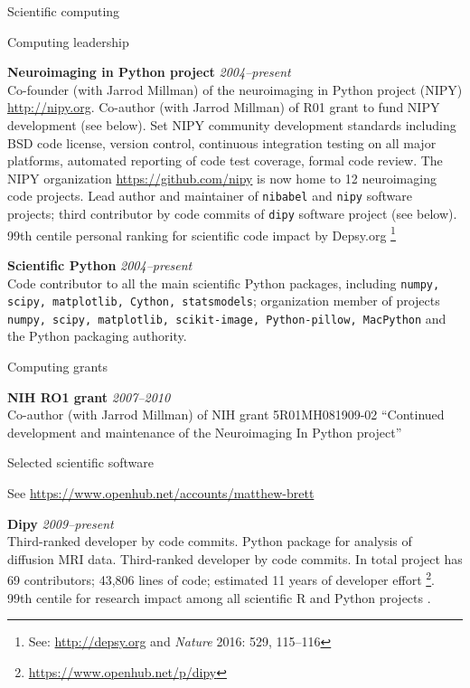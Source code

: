 \documentclass{cv}
\newcommand{\PlaceDateNote}[3]{{\bf #1} \hfill {\em #2} \\#3}
\newcommand{\Pkg}[1]{{\tt #1}}
\begin{document}
\begin{cvSection}{Scientific computing}

\begin{cvSubSection}{Computing leadership}

\PlaceDateNote{Neuroimaging in Python project}{2004--present}
{Co-founder (with Jarrod Millman) of the neuroimaging in Python project (NIPY)
    \url{http://nipy.org}.  Co-author (with Jarrod Millman) of R01 grant to
    fund NIPY development (see below).  Set
    NIPY community development standards including BSD code license, version
    control, continuous integration testing on all major platforms, automated
    reporting of code test coverage, formal code review.  The NIPY
    organization \url{https://github.com/nipy} is now home to 12 neuroimaging
code projects.  Lead author and maintainer of \Pkg{nibabel} and \Pkg{nipy}
software projects; third contributor by code commits of \Pkg{dipy} software
project (see below).  99th centile personal ranking for scientific code impact
by Depsy.org \footnote{See: \url{http://depsy.org} and {\em Nature} 2016: 529,
115–116\label{depsy}}}

\PlaceDateNote{Scientific Python}{2004--present}
{Code contributor to all the main scientific Python packages, including
    \Pkg{numpy, scipy, matplotlib, Cython, statsmodels}; organization member
    of projects \Pkg{numpy, scipy, matplotlib, scikit-image, Python-pillow,
MacPython} and the Python packaging authority.}

\end{cvSubSection}

\begin{cvSubSection}{Computing grants}

\PlaceDateNote{NIH RO1 grant}{2007--2010}
{Co-author (with Jarrod Millman) of NIH grant 5R01MH081909-02 ``Continued
development and maintenance of the Neuroimaging In Python project''}

\end{cvSubSection}

\begin{cvSubSection}{Selected scientific software}

See \url{https://www.openhub.net/accounts/matthew-brett}

\PlaceDateNote{Dipy}{2009--present}
{Third-ranked developer by code commits.  Python package for analysis of
    diffusion MRI data.  Third-ranked developer by code commits.  In total
    project has 69 contributors; 43,806 lines of code; estimated 11 years of
    developer effort
\footnote{\url{https://www.openhub.net/p/dipy}}. 99th centile for research
impact among all scientific R and Python projects \footref{depsy}.}


\end{cvSubSection}
\end{cvSection}
\end{document}
